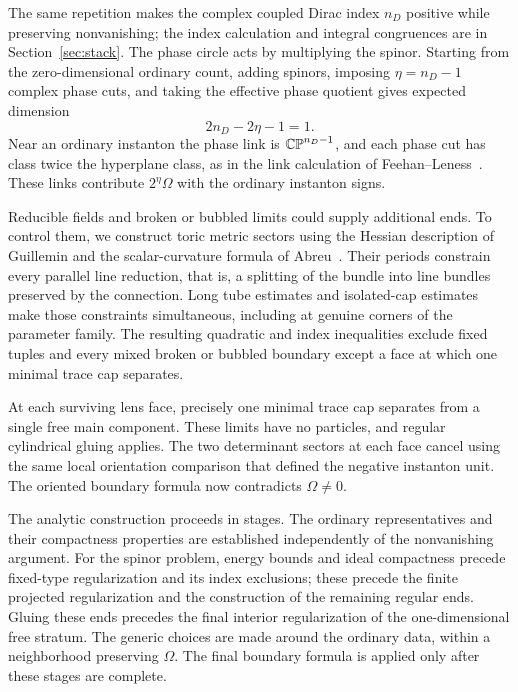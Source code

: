 The same repetition makes the complex coupled Dirac index $n_D$
positive while preserving nonvanishing; the index calculation and
integral congruences are in Section~\ref{sec:stack}.
The phase circle acts by multiplying the spinor.  Starting from the
zero-dimensional ordinary count, adding spinors, imposing
$\eta=n_D-1$ complex phase cuts, and taking the effective phase
quotient gives expected dimension
\[
 2n_D-2\eta-1=1.
\]
Near an ordinary instanton the phase link is $\mathbb{CP}^{n_D-1}$, and each
phase cut has class twice the hyperplane class, as in the link
calculation of Feehan--Leness~\cite[Lemma~3.28 and
Proposition~3.29, arXiv version~3]{FeehanLenessPU2II}.  These links contribute
$2^\eta\Omega$ with the ordinary instanton signs.

Reducible fields and broken or bubbled limits could supply additional
ends.  To control them, we construct toric metric sectors using the
Hessian description of Guillemin and the scalar-curvature formula of
Abreu~\cite{Guillemin1994,Abreu1998}.  Their periods constrain every
parallel line reduction, that is, a splitting of the bundle into line
bundles preserved by the connection. Long tube estimates and
isolated-cap estimates make those constraints simultaneous, including
at genuine corners of the parameter family. The resulting quadratic
and index inequalities exclude fixed tuples and every mixed broken or
bubbled boundary except a face at which one minimal trace cap separates.

At each surviving lens face, precisely one minimal trace cap separates
from a single free main component. These limits have no particles, and
regular cylindrical gluing applies. The two determinant sectors at each face cancel using
the same local orientation comparison that defined the negative
instanton unit. The oriented boundary formula now contradicts
$\Omega\ne0$.

The analytic construction proceeds in stages. The ordinary representatives
and their compactness properties are established independently of the
nonvanishing argument. For the spinor problem, energy bounds and ideal
compactness precede fixed-type regularization and its index exclusions;
these precede the finite projected regularization and the construction of
the remaining regular ends.  Gluing these ends precedes the final
interior regularization of the one-dimensional free stratum.
The generic choices are made around the
ordinary data, within a neighborhood preserving $\Omega$. The final
boundary formula is applied only after these stages are complete.

